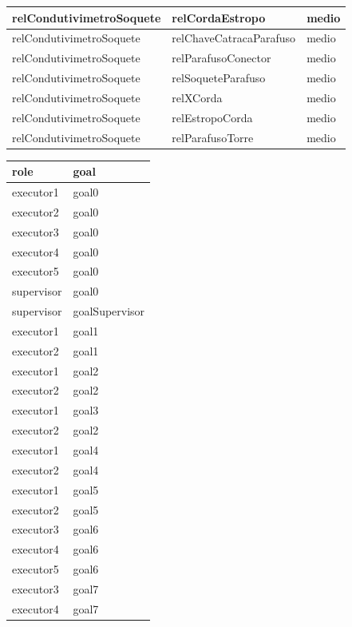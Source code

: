 \documentclass[12pt]{article}
\begin{document}
\begin{table}[H]
\begin{tabular}{|l|l|l|}
relCondutivimetroSoquete & relCordaEstropo & medio \\ \hline
relCondutivimetroSoquete & relChaveCatracaParafuso & medio \\ \hline
relCondutivimetroSoquete & relParafusoConector & medio \\ \hline
relCondutivimetroSoquete & relSoqueteParafuso & medio \\ \hline
relCondutivimetroSoquete & relXCorda & medio \\ \hline
relCondutivimetroSoquete & relEstropoCorda & medio \\ \hline
relCondutivimetroSoquete & relParafusoTorre & medio \\ \hline
\end{tabular}
\end{table}


\begin{table}[H]
\centering
{}
\begin{tabular}{|l|l|}
\hline
\textbf{role} & \textbf{goal} \\ \hline
executor1 & goal0 \\ \hline
executor2 & goal0 \\ \hline
executor3 & goal0 \\ \hline
executor4 & goal0 \\ \hline
executor5 & goal0 \\ \hline
supervisor & goal0 \\ \hline
supervisor & goalSupervisor \\ \hline
executor1 & goal1 \\ \hline
executor2 & goal1 \\ \hline
executor1 & goal2 \\ \hline
executor2 & goal2 \\ \hline
executor1 & goal3 \\ \hline
executor2 & goal2 \\ \hline
executor1 & goal4 \\ \hline
executor2 & goal4 \\ \hline
executor1 & goal5 \\ \hline
executor2 & goal5 \\ \hline
executor3 & goal6 \\ \hline
executor4 & goal6 \\ \hline
executor5 & goal6 \\ \hline
executor3 & goal7 \\ \hline
executor4 & goal7 \\ \hline

\end{tabular}
\end{table}
\end{document}
